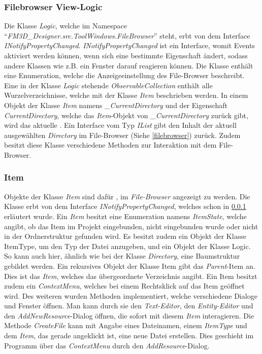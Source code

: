 \subsubsection{Filebrowser View-Logic}
\label{fbview}
Die Klasse \textit{Logic}, welche im Namespace "`\textit{FM3D\_Designer.src.ToolWindows.FileBrowser}"' steht, erbt von dem Interface \textit{INotifyPropertyChanged}. \textit{INotifyPropertyChanged} ist ein Interface, womit Events aktiviert werden können, wenn sich eine bestimmte Eigenschaft ändert, sodass andere Klassen wie z.B. ein Fenster darauf reagieren können.
Die Klasse enthält eine Enumeration, welche die Anzeigeeinstellung des File-Browser beschreibt. 
Eine in der Klasse \textit{Logic} stehende \textit{ObservableCollection} enthält alle Wurzelverzeichnisse, welche mit der Klasse \textit{Item} beschrieben werden. In einem Objekt der Klasse \textit{Item} namens \textit{\_CurrentDirectory} und der Eigenschaft \textit{CurrentDirectory}, welche das \textit{Item}-Objekt von \textit{\_CurrentDirectory} zurück gibt, wird das aktuelle . Ein Interface vom Typ \textit{IList} gibt den Inhalt der aktuell ausgewählten \textit{Directory} im File-Browser (Siehe \cref{filebrowser}) zurück. Zudem besitzt diese Klasse verschiedene Methoden zur Interaktion mit dem File-Browser.

\subsubsection{Item}
\label{item}
Objekte der Klasse \textit{Item} sind dafür , im \textit{File-Browser} angezeigt zu werden. Die Klasse erbt von dem Interface \textit{INotifyPropertyChanged}, welches schon in \cref{fbview} erläutert wurde. Ein \textit{Item} besitzt eine Enumeration namens \textit{ItemState}, welche angibt, ob das Item im Projekt eingebunden, nicht eingebunden wurde oder nicht in der Ordnerstruktur gefunden wird. Es besitzt zudem ein Objekt der Klasse ItemType, um den Typ der Datei anzugeben, und ein Objekt der Klasse Logic. So kann auch hier, ähnlich wie bei der Klasse \textit{Directory}, eine Baumstruktur gebildet werden.
Ein rekursives Objekt der Klasse Item gibt das \textit{Parent}-Item an. Dies ist das \textit{Item}, welches das übergeordnete Verzeichnis angibt.
Ein Item besitzt zudem ein \textit{ContextMenu}, welches bei einem Rechtsklick auf das Item geöffnet wird. Des weiteren wurden Methoden implementiert, welche verschiedene Dialoge und Fenster öffnen. Man kann durch sie den \textit{Text-Editor}, den \textit{Entity-Editor} und den \textit{AddNewResource}-Dialog öffnen, die sofort mit diesem \textit{Item} interagieren.
Die Methode \textit{CreateFile} kann mit Angabe eines Dateinamen, einem \textit{ItemType} und dem \textit{Item}, das gerade angeklickt ist, eine neue Datei erstellen. Dies geschieht im Programm über das \textit{ContextMenu} durch den \textit{AddResource}-Dialog.

